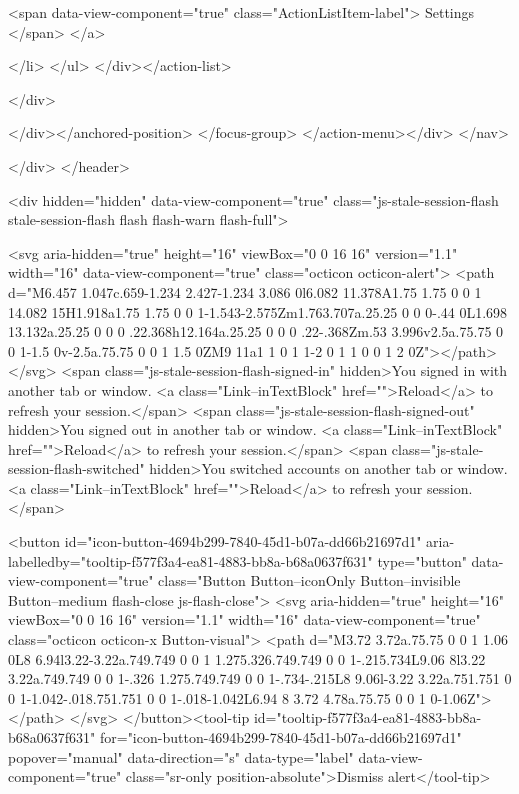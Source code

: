{{        <span data-view-component="true" class="ActionListItem-label">
          Settings
</span>      
</a>
  
</li>
</ul>    
</div></action-list>


</div>
      
</div></anchored-position>  </focus-group>
</action-menu></div>
</nav>
          
        </div>
</header>


      <div hidden="hidden" data-view-component="true" class="js-stale-session-flash stale-session-flash flash flash-warn flash-full">
  
        <svg aria-hidden="true" height="16" viewBox="0 0 16 16" version="1.1" width="16" data-view-component="true" class="octicon octicon-alert">
    <path d="M6.457 1.047c.659-1.234 2.427-1.234 3.086 0l6.082 11.378A1.75 1.75 0 0 1 14.082 15H1.918a1.75 1.75 0 0 1-1.543-2.575Zm1.763.707a.25.25 0 0 0-.44 0L1.698 13.132a.25.25 0 0 0 .22.368h12.164a.25.25 0 0 0 .22-.368Zm.53 3.996v2.5a.75.75 0 0 1-1.5 0v-2.5a.75.75 0 0 1 1.5 0ZM9 11a1 1 0 1 1-2 0 1 1 0 0 1 2 0Z"></path>
</svg>
        <span class="js-stale-session-flash-signed-in" hidden>You signed in with another tab or window. <a class="Link--inTextBlock" href="">Reload</a> to refresh your session.</span>
        <span class="js-stale-session-flash-signed-out" hidden>You signed out in another tab or window. <a class="Link--inTextBlock" href="">Reload</a> to refresh your session.</span>
        <span class="js-stale-session-flash-switched" hidden>You switched accounts on another tab or window. <a class="Link--inTextBlock" href="">Reload</a> to refresh your session.</span>

    <button id="icon-button-4694b299-7840-45d1-b07a-dd66b21697d1" aria-labelledby="tooltip-f577f3a4-ea81-4883-bb8a-b68a0637f631" type="button" data-view-component="true" class="Button Button--iconOnly Button--invisible Button--medium flash-close js-flash-close">  <svg aria-hidden="true" height="16" viewBox="0 0 16 16" version="1.1" width="16" data-view-component="true" class="octicon octicon-x Button-visual">
    <path d="M3.72 3.72a.75.75 0 0 1 1.06 0L8 6.94l3.22-3.22a.749.749 0 0 1 1.275.326.749.749 0 0 1-.215.734L9.06 8l3.22 3.22a.749.749 0 0 1-.326 1.275.749.749 0 0 1-.734-.215L8 9.06l-3.22 3.22a.751.751 0 0 1-1.042-.018.751.751 0 0 1-.018-1.042L6.94 8 3.72 4.78a.75.75 0 0 1 0-1.06Z"></path>
</svg>
</button><tool-tip id="tooltip-f577f3a4-ea81-4883-bb8a-b68a0637f631" for="icon-button-4694b299-7840-45d1-b07a-dd66b21697d1" popover="manual" data-direction="s" data-type="label" data-view-component="true" class="sr-only position-absolute">Dismiss alert</tool-tip>


}}
